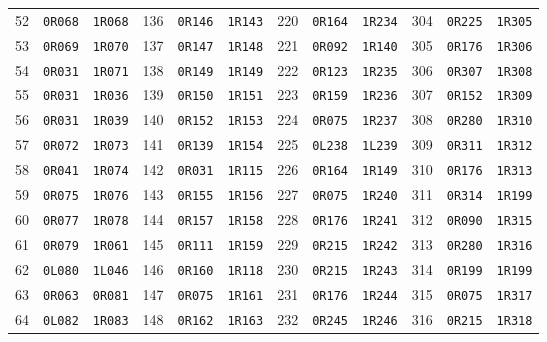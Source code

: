 \begin{longtable}{rll@{\qquad}rll@{\qquad}rll@{\qquad}rll}
52 & \texttt{0R068} & \texttt{1R068} & 136 & \texttt{0R146} & \texttt{1R143} & 220 & \texttt{0R164} & \texttt{1R234} & 304 & \texttt{0R225} & \texttt{1R305} \\
53 & \texttt{0R069} & \texttt{1R070} & 137 & \texttt{0R147} & \texttt{1R148} & 221 & \texttt{0R092} & \texttt{1R140} & 305 & \texttt{0R176} & \texttt{1R306} \\
54 & \texttt{0R031} & \texttt{1R071} & 138 & \texttt{0R149} & \texttt{1R149} & 222 & \texttt{0R123} & \texttt{1R235} & 306 & \texttt{0R307} & \texttt{1R308} \\
55 & \texttt{0R031} & \texttt{1R036} & 139 & \texttt{0R150} & \texttt{1R151} & 223 & \texttt{0R159} & \texttt{1R236} & 307 & \texttt{0R152} & \texttt{1R309} \\
56 & \texttt{0R031} & \texttt{1R039} & 140 & \texttt{0R152} & \texttt{1R153} & 224 & \texttt{0R075} & \texttt{1R237} & 308 & \texttt{0R280} & \texttt{1R310} \\
57 & \texttt{0R072} & \texttt{1R073} & 141 & \texttt{0R139} & \texttt{1R154} & 225 & \texttt{0L238} & \texttt{1L239} & 309 & \texttt{0R311} & \texttt{1R312} \\
58 & \texttt{0R041} & \texttt{1R074} & 142 & \texttt{0R031} & \texttt{1R115} & 226 & \texttt{0R164} & \texttt{1R149} & 310 & \texttt{0R176} & \texttt{1R313} \\
59 & \texttt{0R075} & \texttt{1R076} & 143 & \texttt{0R155} & \texttt{1R156} & 227 & \texttt{0R075} & \texttt{1R240} & 311 & \texttt{0R314} & \texttt{1R199} \\
60 & \texttt{0R077} & \texttt{1R078} & 144 & \texttt{0R157} & \texttt{1R158} & 228 & \texttt{0R176} & \texttt{1R241} & 312 & \texttt{0R090} & \texttt{1R315} \\
61 & \texttt{0R079} & \texttt{1R061} & 145 & \texttt{0R111} & \texttt{1R159} & 229 & \texttt{0R215} & \texttt{1R242} & 313 & \texttt{0R280} & \texttt{1R316} \\
62 & \texttt{0L080} & \texttt{1L046} & 146 & \texttt{0R160} & \texttt{1R118} & 230 & \texttt{0R215} & \texttt{1R243} & 314 & \texttt{0R199} & \texttt{1R199} \\
63 & \texttt{0R063} & \texttt{0R081} & 147 & \texttt{0R075} & \texttt{1R161} & 231 & \texttt{0R176} & \texttt{1R244} & 315 & \texttt{0R075} & \texttt{1R317} \\
64 & \texttt{0L082} & \texttt{1R083} & 148 & \texttt{0R162} & \texttt{1R163} & 232 & \texttt{0R245} & \texttt{1R246} & 316 & \texttt{0R215} & \texttt{1R318} \\

\end{longtable}
